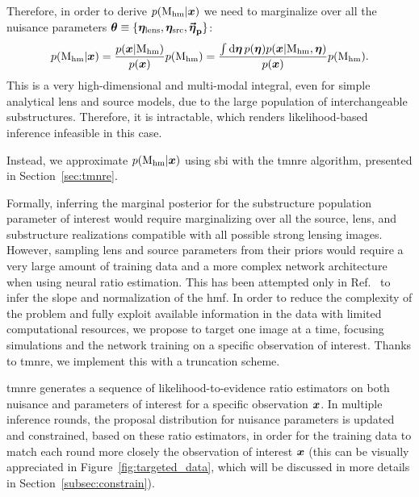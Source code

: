 Therefore, in order to derive $p(\mathrm{M_{hm}}|\bm{x})$ we need to marginalize over all the nuisance parameters $\bm{\theta}\equiv\{\bm{\eta}_\mathrm{lens}, \bm{\eta}_\mathrm{src}, \boldsymbol{\vec{{\bm{\eta}}}_\mathrm{p}}\}$:
\begin{equation}\label{eq:post}
     p(\mathrm{M_{hm}}|\bm{x}) = 
     \frac{p(\bm{x}|\mathrm{M_{hm}})}{p(\bm{x})} p(\mathrm{M_{hm}}) =
     \frac{\int \dd{\ensuremath{\bm{\eta}}} p(\bm{\eta}) p(\bm{x}|\mathrm{M_{hm}}, \bm{\eta})}{p(\bm{x})} p(\mathrm{M_{hm}}).
\end{equation}
This is a very high-dimensional and multi-modal integral, even for simple analytical lens and source models, due to the large population of interchangeable substructures. Therefore, it is intractable, which renders likelihood-based inference infeasible in this case.

Instead, we approximate $p(\mathrm{M_{hm}}|\bm{x})$ using \gls*{sbi} with the \gls*{tmnre} algorithm, presented in Section~\ref{sec:tmnre}.


Formally, inferring the marginal posterior for the substructure population parameter of interest would require marginalizing over all the source, lens, and substructure realizations compatible with all possible strong lensing images. However, sampling lens and source parameters from their priors would require a very large amount of training data and a more complex network architecture when using neural ratio estimation. This has been attempted only in Ref.~\cite{Brehmer:2019jyt} to infer the slope and normalization of the \gls*{hmf}. In order to reduce the complexity of the problem and fully exploit available information in the data with limited computational resources, we propose to target one image at a time, focusing simulations and the network training on a specific observation of interest. Thanks to \gls*{tmnre}, we implement this with a truncation scheme.

\gls*{tmnre} generates a sequence of likelihood-to-evidence ratio estimators on both nuisance and parameters of interest for a specific observation $\bm{x}$. In multiple inference rounds, the proposal distribution for nuisance parameters is updated and constrained, based on these ratio estimators, in order for the training data to match each round more closely the observation of interest $\bm{x}$ (this can be visually appreciated in Figure~\ref{fig:targeted_data}, which will be discussed in more details in Section~\ref{subsec:constrain}). 

